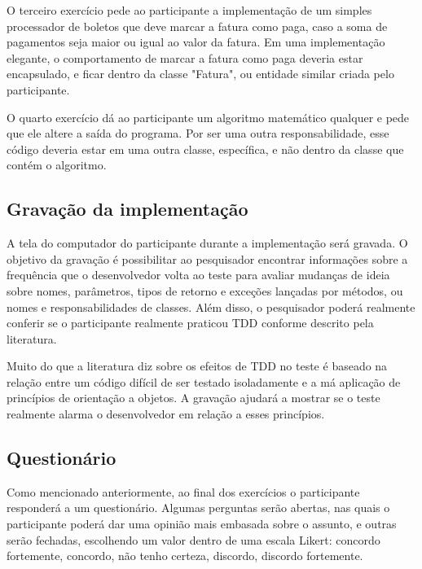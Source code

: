 O terceiro exercício pede ao participante a implementação de um simples processador de boletos que
deve marcar a fatura como paga, caso a soma de pagamentos seja maior ou igual ao valor da fatura. 
Em uma implementação elegante, o comportamento de marcar a fatura como paga deveria estar encapsulado, e 
ficar dentro da classe "Fatura", ou entidade similar criada pelo participante.

O quarto exercício dá ao participante um algoritmo matemático qualquer e pede que ele altere a saída
do programa. Por ser uma outra responsabilidade, esse código deveria estar em uma outra classe, específica,
e não dentro da classe que contém o algoritmo.

\subsection{Gravação da implementação}
\label{sec:planejamento-gravacao}

A tela do computador do participante durante a implementação será gravada. 
O objetivo da gravação é possibilitar ao pesquisador encontrar informações
sobre a frequência que o desenvolvedor volta ao teste para avaliar mudanças de ideia sobre
nomes, parâmetros, tipos de retorno e exceções lançadas por métodos, ou nomes
e responsabilidades de classes. Além disso, o pesquisador poderá realmente
conferir se o participante realmente praticou TDD conforme descrito pela
literatura.

Muito do que a literatura diz sobre os efeitos de TDD no teste é baseado
na relação entre um código difícil de ser testado isoladamente e a má aplicação
de princípios de orientação a objetos. A gravação ajudará a mostrar se o teste
realmente alarma o desenvolvedor em relação a esses princípios.

\subsection{Questionário}
\label{sec:questionario}

Como mencionado anteriormente, ao final dos exercícios o participante responderá a um questionário.
Algumas
perguntas serão abertas, nas quais o participante poderá dar uma opinião mais embasada sobre o assunto,
e outras serão fechadas, escolhendo um valor dentro de uma escala
Likert: concordo fortemente, concordo, não tenho certeza,
discordo, discordo fortemente.

